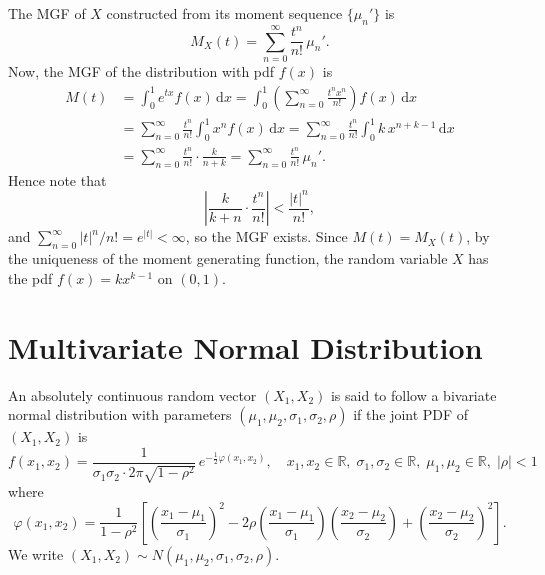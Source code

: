 \begin{solution}
    The MGF of $X$ constructed from its moment sequence $\{\mu_n'\}$ is
    \[
        M_X(t) = \sum_{n=0}^{\infty} \frac{t^n}{n!}\, \mu_n'.
    \]
    Now, the MGF of the distribution with pdf $f(x)$ is
    \begin{align*}
        M(t) &= \int^1_0 e^{tx} f(x) \, \mathrm{d}x
        = \int^1_0 \left( \sum_{n=0}^{\infty} \frac{t^n x^n}{n!} \right) f(x) \, \mathrm{d}x\\
        &= \sum_{n=0}^{\infty} \frac{t^n}{n!} \int^1_0 x^n f(x) \, \mathrm{d}x
        = \sum_{n=0}^{\infty} \frac{t^n}{n!} \int^1_0 k\, x^{n+k-1} \, \mathrm{d}x\\
        &= \sum_{n=0}^{\infty} \frac{t^n}{n!} \cdot \frac{k}{n+k}
        = \sum_{n=0}^{\infty} \frac{t^n}{n!}\, \mu_n'.
    \end{align*}
    Hence note that
    \[
        \left| \frac{k}{k+n} \cdot \frac{t^n}{n!} \right|
        < \frac{|t|^n}{n!},
    \]
    and $\sum_{n=0}^{\infty} |t|^n / n! = e^{|t|} < \infty$, so the MGF exists.
    Since $M(t) = M_X(t)$, by the uniqueness of the moment generating function,
    the random variable $X$ has the pdf $f(x) = kx^{k-1}$ on $(0,1)$.
\end{solution}

\section{Multivariate Normal Distribution}

An absolutely continuous random vector $(X_1, X_2)$ is said to follow a bivariate normal distribution with parameters $(\mu_1, \mu_2, \sigma_1, \sigma_2, \rho)$ if the joint PDF of $(X_1, X_2)$ is
\[
    f(x_1, x_2) = \frac{1}{\sigma_1 \sigma_2 \cdot 2\pi \sqrt{1 - \rho^2}} \, e^{-\frac{1}{2} \varphi(x_1, x_2)}, \quad x_1, x_2 \in \mathbb{R}, \; \sigma_1, \sigma_2 \in \mathbb{R}, \; \mu_1, \mu_2 \in \mathbb{R}, \; |\rho| < 1
\]
where
\[
    \varphi(x_1, x_2) = \frac{1}{1 - \rho^2} \left[ \left( \frac{x_1 - \mu_1}{\sigma_1} \right)^2 - 2\rho \left( \frac{x_1 - \mu_1}{\sigma_1} \right) \left( \frac{x_2 - \mu_2}{\sigma_2} \right) + \left( \frac{x_2 - \mu_2}{\sigma_2} \right)^2 \right].
\]
We write $(X_1, X_2) \sim N(\mu_1, \mu_2, \sigma_1, \sigma_2, \rho)$.

